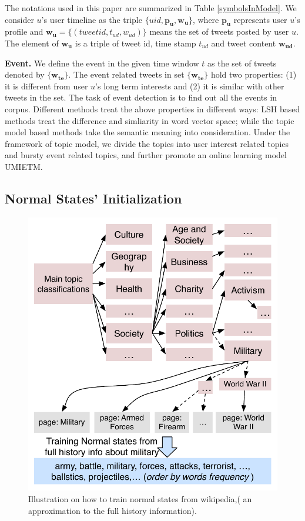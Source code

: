 \documentclass{sig-alternate-05-2015}
\begin{document}
The notations used in this paper are summarized in Table \ref{symbolsInModel}.
We consider \(u\)'s user timeline as  the triple \(\{uid, \bm{p_u},\bm{w_u}\} \), where \(\bm{p_u}\) represents user \(u\)'s profile and \(\bm{w_u}=\{(tweetid, t_{ud},w_{ud})\}\) means the set of tweets posted by user \(u\).
The element of \(\bm{w_u}\) is a triple of tweet id, time stamp \(t_{ud}\) and tweet content \(\bm{w_{ud}}\).



\textbf{Event.} We define the event in the given time window \(t\) as the set of tweets denoted by \( \{ \bm{w_{te}}\}\).
The event related tweets in set \( \{ \bm{w_{te}}\}\)  hold two properties: (1) it is different from user \(u\)'s long term interests and (2) it is similar with other tweets in the set.
The task of event detection is to find out all the events in corpus.
Different methods treat the above properties in different ways: LSH based methods\cite{petrovic2010streaming} treat the difference and simliarity in word vector space; while the topic model based methods\cite{timeUserLDA2012finding} take the semantic meaning into consideration.
Under the framework of topic model, we divide the topics into user interest related topics and bursty event related topics, and further promote an online learning model UMIETM.
\subsection{Normal States' Initialization}
\begin{figure}
    \centering
    \includegraphics[width=1.0\columnwidth]{img/normalStatesFromHistoryInfo.pdf}  
    \caption{Illustration on how to train normal states from wikipedia,( an approximation to the full history information).}
    \label{fig:modelDesc}
\end{figure}
\end{document}
